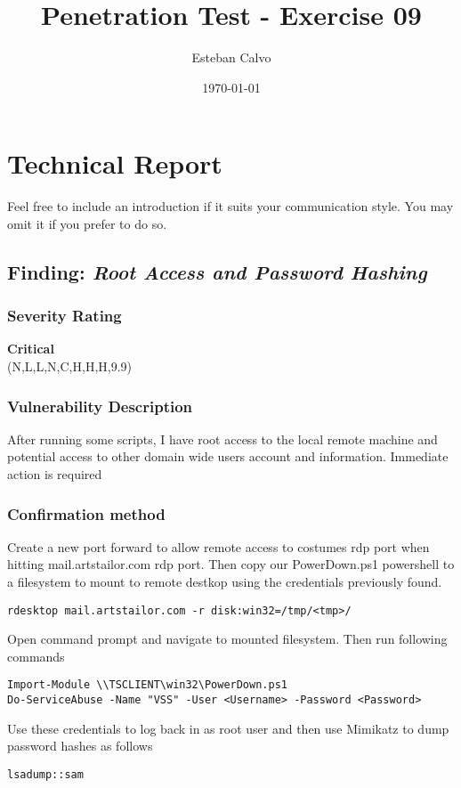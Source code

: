 \documentclass[notitlepage]{article}
\begin{document}
  
\title{Penetration Test - Exercise 09}
\author{Esteban Calvo}
\date{\isodate\today}

\maketitle

\tableofcontents

\newpage

\section{Technical Report}

Feel free to include an introduction if it suits your communication style.
You may omit it if you prefer to do so.


  \subsection{Finding: \emph{Root Access and Password Hashing}}
	\subsubsection*{Severity Rating}
        \textbf{Critical} \\
		\cvss(N,L,L,N,C,H,H,H,9.9)
		
  	\subsubsection*{Vulnerability Description}
  		After running some scripts, I have root access to the local remote machine and potential
        access to other domain wide users account and information. Immediate action is required

  	\subsubsection*{Confirmation method}
  	Create a new port forward to allow remote access to costumes rdp port when hitting mail.artstailor.com
    rdp port. Then copy our PowerDown.ps1 powershell to a filesystem to mount to remote destkop using
    the credentials previously found.
    \begin{verbatim}
rdesktop mail.artstailor.com -r disk:win32=/tmp/<tmp>/
    \end{verbatim}
    Open command prompt and navigate to mounted filesystem. Then run following commands
    \begin{verbatim}
Import-Module \\TSCLIENT\win32\PowerDown.ps1
Do-ServiceAbuse -Name "VSS" -User <Username> -Password <Password>
    \end{verbatim}
    Use these credentials to log back in as root user and then use Mimikatz to dump password hashes as follows
    \begin{verbatim}
lsadump::sam
    \end{verbatim}
\end{document}
